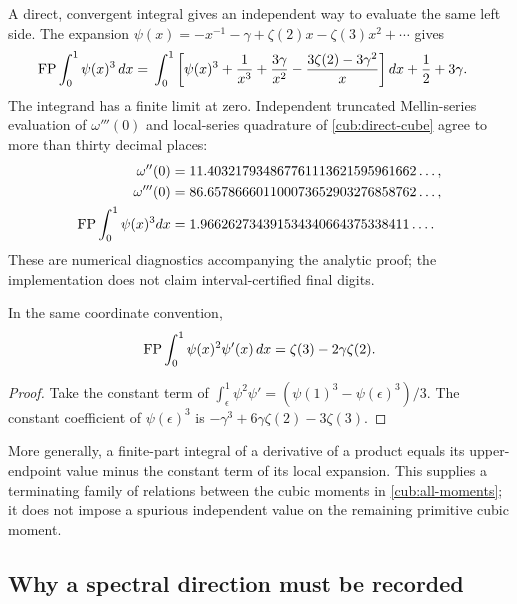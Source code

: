 A direct, convergent integral gives an independent way to evaluate
the same left side.  The expansion
$\psi(x)=-x^{-1}-\gamma+\zeta(2)x-\zeta(3)x^2+\cdots$ gives
\begin{align}
 \operatorname*{FP}\int_0^1\psi(x)^3\,dx
 ={}&\int_0^1\left[\psi(x)^3+\frac1{x^3}
       +\frac{3\gamma}{x^2}
       -\frac{3\zeta(2)-3\gamma^2}{x}\right]dx
       +\frac12+3\gamma.
 \label{cub:direct-cube}
\end{align}
The integrand has a finite limit at zero.  Independent truncated
Mellin-series evaluation of $\omega'''(0)$ and local-series quadrature
of \eqref{cub:direct-cube} agree to more than thirty decimal places:
\begin{align}
 \omega''(0)&=11.403217934867761113621595961662\ldots,\notag\\
 \omega'''(0)&=86.657866601100073652903276858762\ldots,\notag\\
 \operatorname*{FP}\int_0^1\psi(x)^3dx
   &=1.966262734391534340664375338411\ldots.
 \label{cub:numerics}
\end{align}
These are numerical diagnostics accompanying the analytic proof;
the implementation does not claim interval-certified final digits.

\begin{corollary}
\label{cub:cubic-derivative}
In the same coordinate convention,
\begin{equation}\label{cub:psi-square-prime}
 \operatorname*{FP}\int_0^1\psi(x)^2\psi'(x)\,dx
             =\zeta(3)-2\gamma\zeta(2).
\end{equation}
\end{corollary}
\begin{proof}
Take the constant term of
$\int_\epsilon^1\psi^2\psi'=(\psi(1)^3-\psi(\epsilon)^3)/3$.
The constant coefficient of $\psi(\epsilon)^3$ is
$-\gamma^3+6\gamma\zeta(2)-3\zeta(3)$.
\end{proof}

More generally, a finite-part integral of a derivative of a product
equals its upper-endpoint value minus the constant term of its local
expansion.  This supplies a terminating family of relations between
the cubic moments in \eqref{cub:all-moments}; it does not impose a
spurious independent value on the remaining primitive cubic moment.

\subsection{Why a spectral direction must be recorded}


